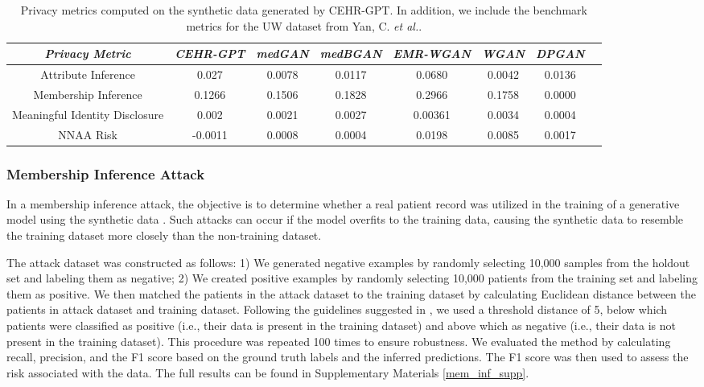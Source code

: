 \begin{multicols}{2}
\begingroup
\setlength{\tabcolsep}{4pt} %
\footnotesize
\begin{table*}[hb]
  \centering
  \begin{tabular}{c|c|cccccc}
  \toprule 
  \textit{Privacy Metric}  & \textit{CEHR-GPT} & \textit{medGAN} & \textit{medBGAN} & \textit{EMR-WGAN} & \textit{WGAN} & \textit{DPGAN} \\
  \midrule
Attribute Inference & 0.027 & 0.0078 & 0.0117 & 0.0680 & 0.0042 & 0.0136 \\
    Membership Inference & 0.1266 & 0.1506 & 0.1828 & 0.2966 & 
    0.1758 &
    0.0000 \\
    Meaningful Identity Disclosure &  0.002 & 0.0021 & 
    0.0027 &
    0.00361 &  0.0034 & 0.0004 \\
    NNAA Risk &  -0.0011 & 0.0008 &  0.0004 & 0.0198 &  0.0085 & 0.0017\\
\hline
  \end{tabular}
  \captionsetup{width=.90\textwidth}
  \caption{Privacy metrics computed on the synthetic data generated by CEHR-GPT. In addition, we include the benchmark metrics for the UW dataset from Yan, C. \textit{et al.}. \cite{Yan_Brad_2022}}
  \label{tab:privacy_metrics_results}
\end{table*}
\endgroup

\subsubsection{Membership Inference Attack}
In a membership inference attack, the objective is to determine whether a real patient record was utilized in the training of a generative model using the synthetic data \cite{Yan_Brad_2022, Theodorou2023}. Such attacks can occur if the model overfits to the training data, causing the synthetic data to resemble the training dataset more closely than the non-training dataset.

The attack dataset was constructed as follows: 1) We generated negative examples by randomly selecting 10,000 samples from the holdout set and labeling them as negative; 2) We created positive examples by randomly selecting 10,000 patients from the training set and labeling them as positive. We then matched the patients in the attack dataset to the training dataset by calculating Euclidean distance between the patients in attack dataset and training dataset. Following the guidelines suggested in \cite{Yan_Brad_2022}, we used a threshold distance of 5, below which patients were classified as positive (i.e., their data is present in the training dataset) and above which as negative (i.e., their data is not present in the training dataset). This procedure was repeated 100 times to ensure robustness. We evaluated the method by calculating recall, precision, and the F1 score based on the ground truth labels and the inferred predictions. The F1 score was then used to assess the risk associated with the data.  The full results can be found in Supplementary Materials \ref{mem_inf_supp}.


\end{multicols}
